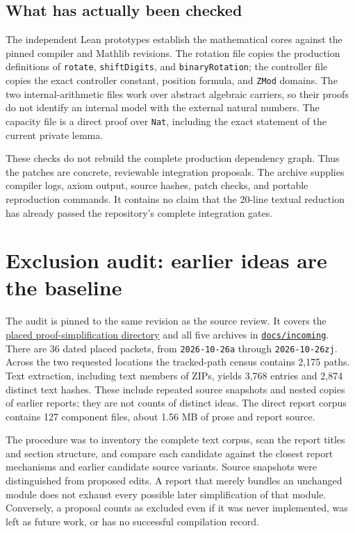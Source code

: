 \documentclass[11pt,letterpaper]{article}
\newcommand{\code}[1]{\nolinkurl{#1}}
\begin{document}
\subsection{What has actually been checked}

The independent Lean prototypes establish the mathematical cores against the pinned compiler and Mathlib revisions. The rotation file copies the production definitions of \code{rotate}, \code{shiftDigits}, and \code{binaryRotation}; the controller file copies the exact controller constant, position formula, and \code{ZMod} domains. The two internal-arithmetic files work over abstract algebraic carriers, so their proofs do not identify an internal model with the external natural numbers. The capacity file is a direct proof over \code{Nat}, including the exact statement of the current private lemma.

These checks do not rebuild the complete production dependency graph. Thus the patches are concrete, reviewable integration proposals. The archive supplies compiler logs, axiom output, source hashes, patch checks, and portable reproduction commands. It contains no claim that the 20-line textual reduction has already passed the repository's complete integration gates.

\section{Exclusion audit: earlier ideas are the baseline}

The audit is pinned to the same revision as the source review. It covers the
\href{https://github.com/VladimirReshetnikov/ProveIt/tree/9d9d1123b39927d30363f1dcd53c23f0575c30ee/Computability/DiophantineConsistency/research/lean-proof-simplification}{placed proof-simplification directory}
and all five archives in
\href{https://github.com/VladimirReshetnikov/ProveIt/tree/9d9d1123b39927d30363f1dcd53c23f0575c30ee/docs/incoming}{\code{docs/incoming}}.
There are 36 dated placed packets, from \code{2026-10-26a} through \code{2026-10-26zj}. Across the two requested locations the tracked-path census contains 2,175 paths. Text extraction, including text members of ZIPs, yields 3,768 entries and 2,874 distinct text hashes. These include repeated source snapshots and nested copies of earlier reports; they are not counts of distinct ideas. The direct report corpus contains 127 component files, about 1.56 MB of prose and report source.

The procedure was to inventory the complete text corpus, scan the report titles and section structure, and compare each candidate against the closest report mechanisms and earlier candidate source variants. Source snapshots were distinguished from proposed edits. A report that merely bundles an unchanged module does not exhaust every possible later simplification of that module. Conversely, a proposal counts as excluded even if it was never implemented, was left as future work, or has no successful compilation record.
\end{document}
